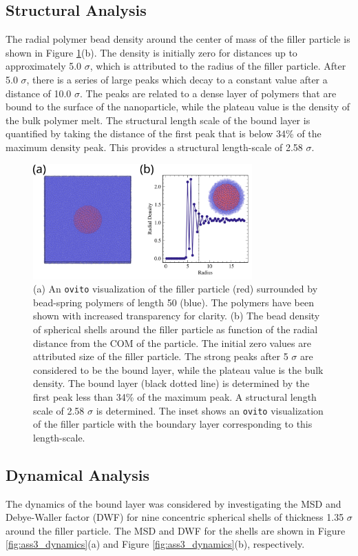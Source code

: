 \documentclass[10pt,a4paper]{labreport}
\begin{document}
\subsection{Structural Analysis}
The radial polymer bead density around the center of mass of the filler particle is shown in Figure \ref{fig:ass3_struct}(b). The density is initially zero for distances up to approximately 5.0 $\sigma$, which is attributed to the radius of the filler particle. After 5.0 $\sigma$, there is a series of large peaks which decay to a constant value after a distance of 10.0 $\sigma$. The peaks are related to a dense layer of polymers that are bound to the surface of the nanoparticle, while the plateau value is the density of the bulk polymer melt. The structural length scale of the  bound layer is quantified by taking the distance of the first peak that is below 34\% of the maximum density peak. This provides a structural length-scale of 2.58 $\sigma$. 
\begin{figure}[h]
  \centering
  \includegraphics[width = 0.75\textwidth]{figs/ass3_struct.png}
  \caption{(a) An \texttt{ovito} visualization of the filler particle (red) surrounded by bead-spring polymers of length 50 (blue). The polymers have been shown with increased transparency for clarity. (b) The bead density of spherical shells around the filler particle as function of the radial distance from the COM of the particle. The initial zero values are attributed size of the filler particle. The strong peaks after 5 $\sigma$ are considered to be the bound layer, while the plateau value is the bulk density. The bound layer (black dotted line) is determined by the first peak less than 34\% of the maximum peak. A structural length scale of 2.58 $\sigma$ is determined. The inset shows an \texttt{ovito} visualization of the filler particle with the boundary layer corresponding to this length-scale. }
  \label{fig:ass3_struct}
\end{figure}

\subsection{Dynamical Analysis}
The dynamics of the bound layer was considered by investigating the MSD and Debye-Waller factor (DWF) for nine concentric spherical shells of thickness 1.35 $\sigma$ around the filler particle. The MSD and DWF for the shells are shown in Figure \ref{fig:ass3_dynamics}(a) and Figure \ref{fig:ass3_dynamics}(b), respectively.
\end{document}
